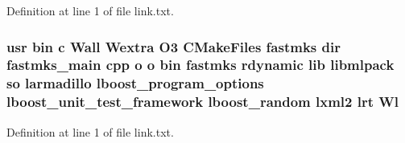 Definition at line 1 of file link.\-txt.

\subsubsection[{Wl}]{\setlength{\rightskip}{0pt plus 5cm}usr bin c Wall Wextra O3 C\-Make\-Files fastmks dir fastmks\-\_\-main cpp o o bin fastmks rdynamic lib libmlpack so larmadillo lboost\-\_\-program\-\_\-options lboost\-\_\-unit\-\_\-test\-\_\-framework lboost\-\_\-random lxml2 lrt Wl}\label{methods_2fastmks_2CMakeFiles_2fastmks_8dir_2link_8txt_ad4e4670f7e0bd74d5f5c32221e2dd91d}


Definition at line 1 of file link.\-txt.

